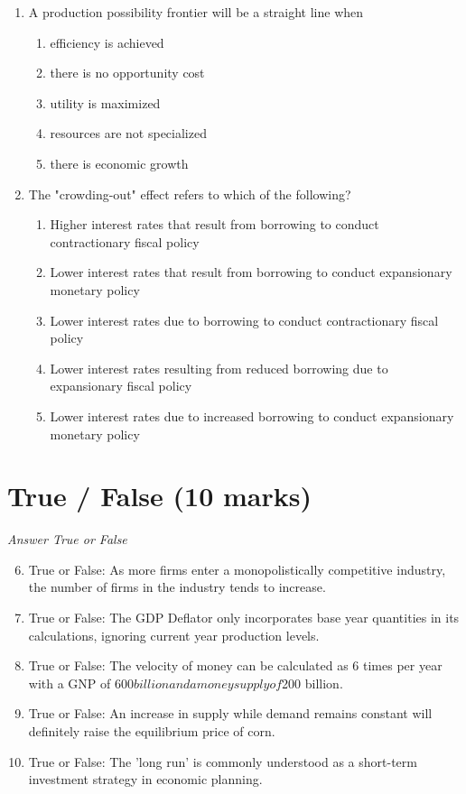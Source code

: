 \documentclass[12pt]{article}
\begin{document}
\begin{enumerate}[label=\arabic*.]
\begin{enumerate}[label=(\alph*)]
\end{enumerate}
\item A production possibility frontier will be a straight line when
\begin{enumerate}[label=(\alph*)]
    \item efficiency is achieved
    \item there is no opportunity cost
    \item utility is maximized
    \item resources are not specialized
    \item there is economic growth
\end{enumerate}
\item The "crowding-out" effect refers to which of the following?
\begin{enumerate}[label=(\alph*)]
    \item Higher interest rates that result from borrowing to conduct contractionary fiscal policy
    \item Lower interest rates that result from borrowing to conduct expansionary monetary policy
    \item Lower interest rates due to borrowing to conduct contractionary fiscal policy
    \item Lower interest rates resulting from reduced borrowing due to expansionary fiscal policy
    \item Lower interest rates due to increased borrowing to conduct expansionary monetary policy
\end{enumerate}
\end{enumerate}

\section*{True / False (10 marks)}
\textit{Answer True or False}
\begin{enumerate}[label=\arabic*.]
\setcounter{enumi}{5}
\item True or False: As more firms enter a monopolistically competitive industry, the number of firms in the industry tends to increase.
\item True or False: The GDP Deflator only incorporates base year quantities in its calculations, ignoring current year production levels.
\item True or False: The velocity of money can be calculated as 6 times per year with a GNP of $600 billion and a money supply of $200 billion.
\item True or False: An increase in supply while demand remains constant will definitely raise the equilibrium price of corn.
\item True or False: The 'long run' is commonly understood as a short-term investment strategy in economic planning.
\end{enumerate}
\end{document}
